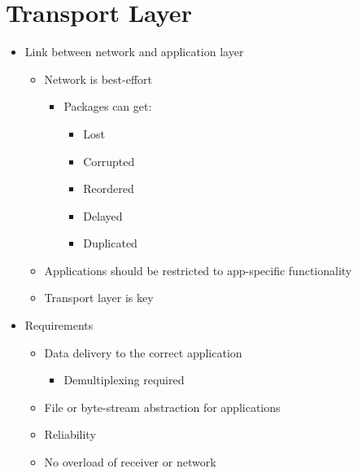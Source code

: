 
\section{Transport Layer}
\begin{itemize}
    \item Link between network and application layer
        \begin{itemize}
            \item Network is best-effort
                \begin{itemize}
                    \item Packages can get:
                        \begin{itemize}
                            \item Lost
                            \item Corrupted
                            \item Reordered
                            \item Delayed
                            \item Duplicated
                        \end{itemize}
                \end{itemize}
            \item Applications should be restricted to app-specific functionality
            \item Transport layer is key
        \end{itemize}
    \item Requirements
        \begin{itemize}
            \item Data delivery to the correct application
                \begin{itemize}
                    \item Demultiplexing required
                \end{itemize}
            \item File or byte-stream abstraction for applications
            \item Reliability
            \item No overload of receiver or network
        \end{itemize}
\end{itemize}

